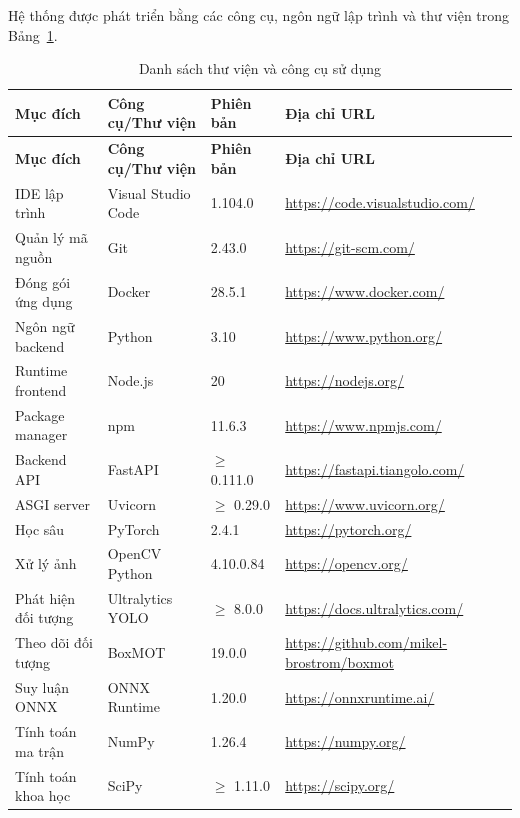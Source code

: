 \documentclass[../DoAn.tex]{subfiles}
\begin{document}
Hệ thống được phát triển bằng các công cụ, ngôn ngữ lập trình và thư viện trong Bảng~\ref{table:tools_libraries}.

\renewcommand{\arraystretch}{1.15}
\begin{longtable}{p{3.2cm} p{4.2cm} p{2.6cm} p{4.8cm}}
\caption{Danh sách thư viện và công cụ sử dụng}
\label{table:tools_libraries} \\

\hline
\textbf{Mục đích} & \textbf{Công cụ/Thư viện} & \textbf{Phiên bản} & \textbf{Địa chỉ URL} \\ \hline
\endfirsthead

\hline
\textbf{Mục đích} & \textbf{Công cụ/Thư viện} & \textbf{Phiên bản} & \textbf{Địa chỉ URL} \\ \hline
\endhead

IDE lập trình & Visual Studio Code & 1.104.0 & \url{https://code.visualstudio.com/} \\ \hline
Quản lý mã nguồn & Git & 2.43.0 & \url{https://git-scm.com/} \\ \hline
Đóng gói ứng dụng & Docker & 28.5.1 & \url{https://www.docker.com/} \\ \hline
Ngôn ngữ backend & Python & 3.10 & \url{https://www.python.org/} \\ \hline
Runtime frontend & Node.js & 20 & \url{https://nodejs.org/} \\ \hline
Package manager & npm & 11.6.3 & \url{https://www.npmjs.com/} \\ \hline
Backend API & FastAPI & $\geq$ 0.111.0 & \url{https://fastapi.tiangolo.com/} \\ \hline
ASGI server & Uvicorn & $\geq$ 0.29.0 & \url{https://www.uvicorn.org/} \\ \hline
Học sâu & PyTorch & 2.4.1 & \url{https://pytorch.org/} \\ \hline
Xử lý ảnh & OpenCV Python & 4.10.0.84 & \url{https://opencv.org/} \\ \hline
Phát hiện đối tượng & Ultralytics YOLO & $\geq$ 8.0.0 & \url{https://docs.ultralytics.com/} \\ \hline
Theo dõi đối tượng & BoxMOT & 19.0.0 & \url{https://github.com/mikel-brostrom/boxmot} \\ \hline
Suy luận ONNX & ONNX Runtime & 1.20.0 & \url{https://onnxruntime.ai/} \\ \hline
Tính toán ma trận & NumPy & 1.26.4 & \url{https://numpy.org/} \\ \hline
Tính toán khoa học & SciPy & $\geq$ 1.11.0 & \url{https://scipy.org/} \\ \hline

\end{longtable}
\end{document}
